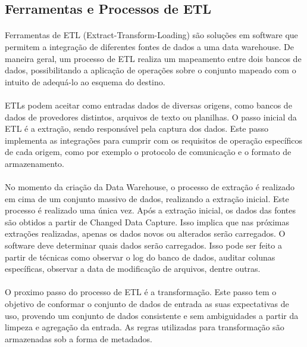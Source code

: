 \subsection{Ferramentas e Processos de ETL} 

\paragraph{} Ferramentas de ETL (Extract-Transform-Loading) são soluções em software que permitem a integração de diferentes fontes de dados a uma data warehouse.
De maneira geral, um processo de ETL realiza um mapeamento entre dois bancos de dados, possibilitando a aplicação de operações sobre o conjunto mapeado com o intuito de adequá-lo ao esquema do destino.

\paragraph{} ETLs podem aceitar como entradas dados de diversas origens, como bancos de dados de provedores distintos, arquivos de texto ou planilhas. O passo inicial da ETL é a extração, sendo responsável pela captura dos dados. Este passo implementa as integrações para cumprir com os requisitos de operação específicos de cada origem, como por exemplo o protocolo de comunicação e o formato de armazenamento.

\paragraph{} No momento da criação da Data Warehouse, o processo de extração é realizado em cima de um conjunto massivo de dados, realizando a extração inicial. Este processo é realizado uma única vez. \cite{kimball2008data} Após a extração inicial, os dados das fontes são obtidos a partir de Changed Data Capture. Isso implica que nas próximas extrações realizadas, apenas os dados novos ou alterados serão carregados. O software deve determinar quais dados serão carregados. Isso pode ser feito a partir de técnicas como observar o log do banco de dados, auditar colunas específicas, observar a data de modificação de arquivos, dentre outras.

\paragraph{} O proximo passo do processo de ETL é a transformação. Este passo tem o objetivo de conformar o conjunto de dados de entrada as suas expectativas de uso, provendo um conjunto de dados consistente e sem ambiguidades a partir da limpeza e agregação da entrada. As regras utilizadas para transformação são armazenadas sob a forma de metadados.

